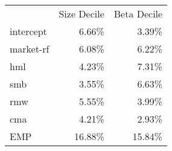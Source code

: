 \begin{tabular}{lrr}
      & \multicolumn{1}{l}{Size Decile} & \multicolumn{1}{l}{Beta  Decile} \\
intercept & 6.66\% & 3.39\% \\
market-rf & 6.08\% & 6.22\% \\
hml   & 4.23\% & 7.31\% \\
smb   & 3.55\% & 6.63\% \\
rmw   & 5.55\% & 3.99\% \\
cma   & 4.21\% & 2.93\% \\
EMP   & 16.88\% & 15.84\% \\
\end{tabular}%
